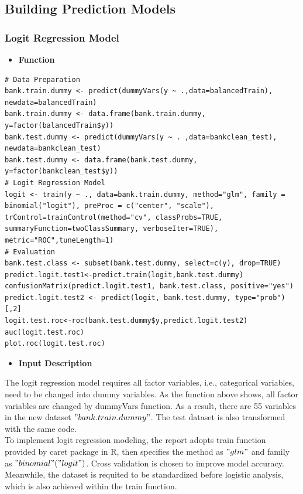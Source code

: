        \subsection{Building Prediction Models}
       \subsubsection{Logit Regression Model}
       \begin{itemize}
     	\item \textbf{Function}
       \end{itemize}
       \begin{lstlisting}
# Data Preparation
bank.train.dummy <- predict(dummyVars(y ~ .,data=balancedTrain), newdata=balancedTrain)
bank.train.dummy <- data.frame(bank.train.dummy, y=factor(balancedTrain$y))
bank.test.dummy <- predict(dummyVars(y ~ . ,data=bankclean_test), newdata=bankclean_test)
bank.test.dummy <- data.frame(bank.test.dummy, y=factor(bankclean_test$y))
# Logit Regression Model
logit <- train(y ~ ., data=bank.train.dummy, method="glm", family = binomial("logit"), preProc = c("center", "scale"), trControl=trainControl(method="cv", classProbs=TRUE, summaryFunction=twoClassSummary, verboseIter=TRUE), metric="ROC",tuneLength=1)
# Evaluation
bank.test.class <- subset(bank.test.dummy, select=c(y), drop=TRUE)
predict.logit.test1<-predict.train(logit,bank.test.dummy)
confusionMatrix(predict.logit.test1, bank.test.class, positive="yes") 
predict.logit.test2 <- predict(logit, bank.test.dummy, type="prob")[,2]
logit.test.roc<-roc(bank.test.dummy$y,predict.logit.test2)
auc(logit.test.roc)
plot.roc(logit.test.roc)
       \end{lstlisting}
       \begin{itemize}
       \item \textbf{Input Description}
       \end{itemize}
       \noindent The logit regression model requires all factor variables, i.e., categorical variables, need to be changed into dummy variables. As the function above shows, all factor variables are changed by dummyVars function. As a result, there are 55 variables in the new dataset $"bank.train.dummy"$. The test dataset is also transformed with the same code. \\
       [\baselineskip]\indent To implement logit regression modeling, the report adopts train function provided by caret package in R, then specifies the method as $"glm"$ and family as $"binomial"("logit")$. Cross validation is chosen to improve model accuracy. Meanwhile, the dataset is requited to be standardized before logistic analysis, which is also achieved within the train function. \\
